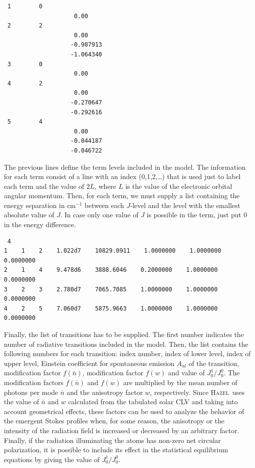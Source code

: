 \documentclass[12pt]{article}
\def\H{\textsc{Hazel}}
\begin{document}
\begin{verbatim}
 1        0
                    0.00
 2        2
                    0.00
                   -0.987913
                   -1.064340
 3        0
                    0.00
 4        2
                    0.00
                   -0.270647
                   -0.292616
 5        4
                    0.00
                   -0.044187
                   -0.046722
\end{verbatim}
The previous lines define the term levels included in the model. The information for each term
consist of a line with an index (0,1,2,\ldots) that is used just to label each term and
the value of $2L$, where $L$ is the value of the electronic orbital angular momentum. Then, for 
each term, we must supply a list containing the energy separation in cm$^{-1}$ between each $J$-level
and the level with the smallest absolute value of $J$. In case only one value of $J$ is possible
in the term, just put 0 in the energy difference.

\begin{verbatim}
 4
1    1    2    1.022d7    10829.0911    1.0000000    1.0000000    0.0000000
2    1    4    9.478d6    3888.6046    0.2000000    1.0000000    0.0000000
3    2    3    2.780d7    7065.7085    1.0000000    1.0000000    0.0000000
4    2    5    7.060d7    5875.9663    1.0000000    1.0000000    0.0000000
\end{verbatim}
Finally, the list of transitions has to be supplied. The first number indicates the number
of radiative transitions included in the model. Then, the list contains the following 
numbers for each transition: index number, index of lower level, index of upper level, Einstein
coefficient for spontaneous emission $A_{ul}$ of the transition, modification factor $f(\bar{n})$,
modification factor $f(w)$ and value of $J^1_0/J^0_0$. The modification factors $f(\bar{n})$ and
$f(w)$ are multiplied by the mean number of photons per mode $\bar{n}$ and the anisotropy factor $w$,
respectively. Since \H\ uses the value of $\bar{n}$ and $w$ calculated from the tabulated solar CLV
and taking into account geometrical effects,
these factors can be used to analyze the behavior of the emergent Stokes profiles when, for some
reason, the anisotropy or the intensity of the radiation field is increased or decreased by an
arbitrary factor. Finally, if the radiation illuminating the atoms has non-zero net circular polarization,
it is possible to include its effect in the statistical equilibrium equations by giving the value of 
$J^1_0/J^0_0$.
\end{document}
